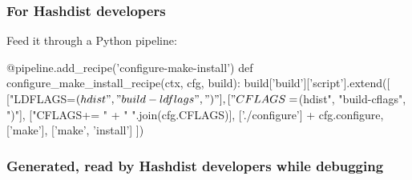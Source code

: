 \documentclass[sans,mathserif]{beamer}
\begin{document}
\begin{frame}[fragile]
  \frametitle{For Hashdist developers}

Feed it through a Python pipeline:
{\footnotesize

\begin{semiverbatim}
@pipeline.add\_recipe('configure-make-install')
def configure\_make\_install\_recipe(ctx, cfg, build):
    build['build']['script'].extend([
        ["LDFLAGS=$(hdist", "build-ldflags", ")"],
        ["CFLAGS=$(hdist", "build-cflags", ")"],
        ["CFLAGS+= " + " ".join(cfg.CFLAGS)],
        ['./configure'] + cfg.configure,
        ['make'],
        ['make', 'install']
        ])
\end{semiverbatim}
}

\end{frame}

\begin{frame}[fragile]
  \frametitle{Generated, read by Hashdist developers while debugging}

{\footnotesize

}

\end{frame}
\end{document}
